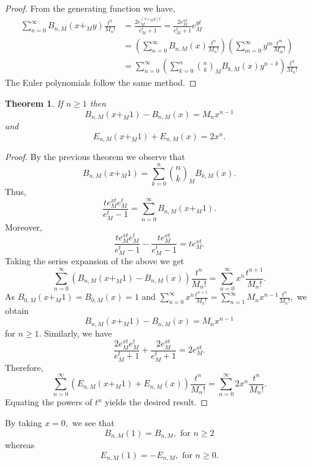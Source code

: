 \documentclass[12pt, a4paper]{article}
\newtheorem{theorem}{Theorem}[section]
\begin{document}
\begin{proof}
From the generating function we have,
\begin{align*}
\sum_{n=0}^{\infty}B_{n,M}(x+_My)\frac{t^n}{M_n!}&= \frac{2e^{(x+_My)t}_M}{e^t_M+1} = \frac{2e^{xt}_M}{e^t_M+1} e^{yt}_M \\
&= \left(\sum_{n=0}^{\infty}B_{n,M}(x)\frac{t^n}{M_n!}\right)\left(\sum_{m=0}^{\infty}y^m\frac{t^m}{M_m!}\right)\\
&= \sum_{n=0}^{\infty}\left(\sum_{k=0}^{n}\binom{n}{k}_MB_{k,M}(x)y^{n-k}\right)\frac{t^n}{M_n!}
\end{align*}
The Euler polynomials follow the same method.
\end{proof}

\begin{theorem}
If $n \geq 1$ then 
\begin{equation*}   \label{BP: 1}
B_{n,M}(x+_M 1) - B_{n,M}(x) = M_n x^{n-1}
\end{equation*}
and 
\begin{equation*}   \label{EP: 1}
E_{n,M}(x+_M1) + E_{n,M}(x) = 2x^n.
\end{equation*}
\end{theorem}
\begin{proof}
By the previous theorem we observe that
\[B_{n,M}(x+_M1) = \sum_{k=0}^{n}\binom{n}{k}_M B_{k,M}(x).\]
Thus, \[\frac{te^{xt}_Me^{t}_M}{e^{t}_M-1} = \sum_{n=0}^{\infty}B_{n,M}(x+_M 1).\]
Moreover,
\[\frac{te^{xt}_Me^{t}_M}{e^{t}_M-1}- \frac{te^{xt}_M}{e^t_M-1} = te^{xt}_M.\]
Taking the series expansion of the above we get
\[\sum_{n=0}^{\infty}(B_{n,M}(x+_M 1) - B_{n,M}(x))\frac{t^n}{M_n!} = \sum_{n=0}^{\infty}x^n \frac{t^{n+1}}{M_n!}.\]
As $B_{0,M}(x+_M1) = B_{0,M}(x) = 1$ and $\sum_{n=0}^{\infty}x^n \frac{t^{n+1}}{M_n!} = \sum_{n=1}^{\infty}M_nx^{n-1}\frac{t^n}{M_n!},$ we obtain
\[B_{n,M}(x+_M 1) - B_{n,M}(x) = M_n x^{n-1}\]
for $n \geq 1.$ 
Similarly, we have
\[\frac{2e^{xt}_Me^t_M}{e^t_M+1}+\frac{2e^{xt}_M}{e^t_M+1} = 2e^{xt}_M.\]
Therefore,
\[\sum_{n=0}^{\infty}(E_{n,M}(x+_M1)+E_{n,M}(x))\frac{t^n}{M_n!} = \sum_{n=0}^{\infty}2x^n\frac{t^n}{M_n!}.\]
Equating the powers of $t^n$ yields the desired result.
\end{proof}
By taking $x=0,$  we see that
\begin{equation} \label{eq:Bn1}
B_{n,M}(1) = B_{n,M}, \text{~for~} n \geq 2 
\end{equation}
whereas 
\begin{equation} \label{eq:En1}
E_{n,M}(1) = -E_{n,M}, \text{~for~} n \geq 0.
\end{equation} 
\end{document}
